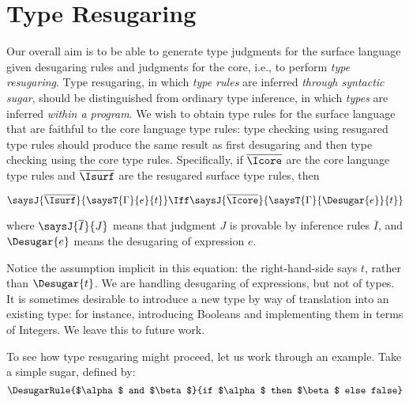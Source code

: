 \section{Type Resugaring} \label{sec:rtype-walkthrough}

Our overall aim is to be able to generate type judgments for the
surface language given desugaring rules and judgments for the core,
i.e., to perform \emph{type resugaring}. Type resugaring, in which
\emph{type rules} are inferred \emph{through syntactic sugar},
should be distinguished from ordinary type
inference, in which \emph{types} are inferred \emph{within a program}.
We wish to obtain type rules for the surface
language that are faithful to the core language type rules:
type checking using resugared type rules should produce
the same result as first desugaring and then type checking using the
core type rules.
Specifically, if $\overline{\Icore}$ are the core language type rules and
$\overline{\Isurf}$ are the resugared surface type rules, then
\begin{goal} \label{goal:rtype-faithful}
\[
\saysJ{\overline{\Isurf}}{\saysT{\Gamma}{e}{t}}
\Iff
\saysJ{\overline{\Icore}}{\saysT{\Gamma}{\Desugar{e}}{t}}
\]
\end{goal}
\noindent
where $\saysJ{\overline{I}}{J}$ means that judgment $J$ is provable by
inference rules $\overline{I}$, and $\Desugar{e}$ means the desugaring
of expression $e$.

Notice the assumption implicit in this equation: the right-hand-side
says $t$, rather than $\Desugar{t}$. We are handling desugaring of
expressions, but not of types. It is sometimes desirable to introduce
a new type by way of translation into an existing type: for instance,
introducing Booleans and implementing them in terms of Integers.
We leave this to future work.

To see how type resugaring might proceed, let us work through an
example. Take a simple  sugar, defined by:
\[
\DesugarRule{$\alpha$ and $\beta$}{if $\alpha$ then $\beta$ else false}
\]


